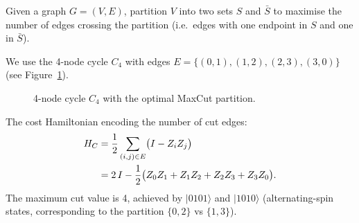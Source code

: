 \documentclass[a4paper,11pt]{article}
\newcommand{\crd}[1]{\textcolor{ibmred}{#1}}
\newcommand{\cblu}[1]{\textcolor{ibmblue}{#1}}
\renewcommand{\ket}[1]{|#1\rangle}
\begin{document}
\begin{defbox}[MaxCut]
Given a graph $G = (V, E)$, partition $V$ into two sets $S$ and $\bar{S}$
to maximise the number of edges crossing the partition
(i.e.\ edges with one endpoint in $S$ and one in $\bar{S}$).
\end{defbox}

\noindent We use the 4-node cycle $C_4$ with edges
$E = \{(0,1),(1,2),(2,3),(3,0)\}$ (see Figure~\ref{fig:cycle}).

\begin{figure}[H]
\centering
{}
\caption{4-node cycle $C_4$ with the optimal MaxCut partition.}
\label{fig:cycle}
\end{figure}

\noindent The cost Hamiltonian encoding the number of cut edges:
\begin{align}
    H_C &= \frac{1}{2}\sum_{(i,j)\in E}\bigl(I - Z_iZ_j\bigr) \notag\\
        &= 2\,I - \frac{1}{2}\bigl(Z_0Z_1 + Z_1Z_2 + Z_2Z_3 + Z_3Z_0\bigr).
\end{align}
The maximum cut value is 4, achieved by $\ket{0101}$ and $\ket{1010}$
(alternating-spin states, corresponding to the partition
$\{0,2\}$ vs $\{1,3\}$).
\end{document}
